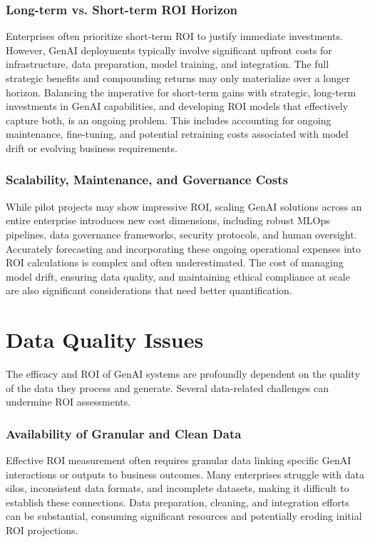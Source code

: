 \documentclass[10pt,journal,compsoc,twocolumn]{IEEEtran}
\begin{document}
\subsubsection{Long-term vs. Short-term ROI Horizon}

Enterprises often prioritize short-term ROI to justify immediate investments. However, GenAI deployments typically involve significant upfront costs for infrastructure, data preparation, model training, and integration. The full strategic benefits and compounding returns may only materialize over a longer horizon. Balancing the imperative for short-term gains with strategic, long-term investments in GenAI capabilities, and developing ROI models that effectively capture both, is an ongoing problem. This includes accounting for ongoing maintenance, fine-tuning, and potential retraining costs associated with model drift or evolving business requirements.


\subsubsection{Scalability, Maintenance, and Governance Costs}

While pilot projects may show impressive ROI, scaling GenAI solutions across an entire enterprise introduces new cost dimensions, including robust MLOps pipelines, data governance frameworks, security protocols, and human oversight. Accurately forecasting and incorporating these ongoing operational expenses into ROI calculations is complex and often underestimated. The cost of managing model drift, ensuring data quality, and maintaining ethical compliance at scale are also significant considerations that need better quantification.


\section{Data Quality Issues}


The efficacy and ROI of GenAI systems are profoundly dependent on the quality of the data they process and generate. Several data-related challenges can undermine ROI assessments.


\subsubsection{Availability of Granular and Clean Data}

Effective ROI measurement often requires granular data linking specific GenAI interactions or outputs to business outcomes. Many enterprises struggle with data silos, inconsistent data formats, and incomplete datasets, making it difficult to establish these connections. Data preparation, cleaning, and integration efforts can be substantial, consuming significant resources and potentially eroding initial ROI projections.
\end{document}
